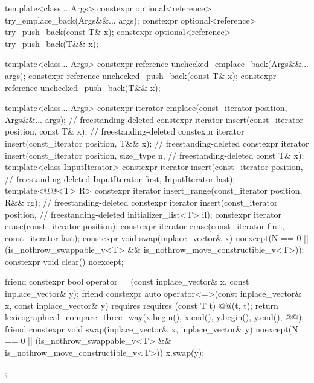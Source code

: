 \begin{codeblock}
{{    template<class... Args>
      constexpr optional<reference> try_emplace_back(Args&&... args);
    constexpr optional<reference> try_push_back(const T& x);
    constexpr optional<reference> try_push_back(T&& x);

    template<class... Args>
      constexpr reference unchecked_emplace_back(Args&&... args);
    constexpr reference unchecked_push_back(const T& x);
    constexpr reference unchecked_push_back(T&& x);

    template<class... Args>
      constexpr iterator emplace(const_iterator position, Args&&... args);  // freestanding-deleted
    constexpr iterator insert(const_iterator position, const T& x);         // freestanding-deleted
    constexpr iterator insert(const_iterator position, T&& x);              // freestanding-deleted
    constexpr iterator insert(const_iterator position, size_type n,         // freestanding-deleted
                              const T& x);
    template<class InputIterator>
      constexpr iterator insert(const_iterator position,                    // freestanding-deleted
                                InputIterator first, InputIterator last);
    template<@@<T> R>
      constexpr iterator insert_range(const_iterator position, R&& rg);     // freestanding-deleted
    constexpr iterator insert(const_iterator position,                      // freestanding-deleted
                              initializer_list<T> il);
    constexpr iterator erase(const_iterator position);
    constexpr iterator erase(const_iterator first, const_iterator last);
    constexpr void swap(inplace_vector& x)
      noexcept(N == 0 || (is_nothrow_swappable_v<T> &&
                          is_nothrow_move_constructible_v<T>));
    constexpr void clear() noexcept;

    friend constexpr bool operator==(const inplace_vector& x,
                                     const inplace_vector& y);
    friend constexpr auto
      operator<=>(const inplace_vector& x, const inplace_vector& y)
        requires requires (const T t) { @@(t, t); }
      {
        return lexicographical_compare_three_way(x.begin(), x.end(), y.begin(), y.end(),
                                                 @@);
      }
    friend constexpr void swap(inplace_vector& x, inplace_vector& y)
      noexcept(N == 0 || (is_nothrow_swappable_v<T> &&
                          is_nothrow_move_constructible_v<T>))
      { x.swap(y); }
  };
}
\end{codeblock}

